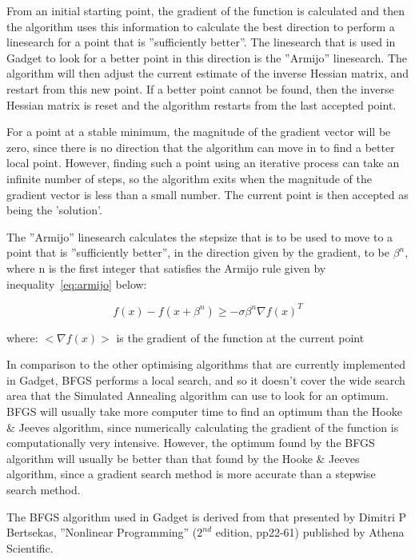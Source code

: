 \documentclass[10pt,twoside]{book}
\begin{document}
\bigskip
From an initial starting point, the gradient of the function is calculated and then the algorithm uses this information to calculate the best direction to perform a linesearch for a point that is ''sufficiently better''.  The linesearch that is used in Gadget to look for a better point in this direction is the ''Armijo'' linesearch.  The algorithm will then adjust the current estimate of the inverse Hessian matrix, and restart from this new point.  If a better point cannot be found, then the inverse Hessian matrix is reset and the algorithm restarts from the last accepted point.

\bigskip
For a point at a stable minimum, the magnitude of the gradient vector will be zero, since there is no direction that the algorithm can move in to find a better local point.  However, finding such a point using an iterative process can take an infinite number of steps, so the algorithm exits when the magnitude of the gradient vector is less than a small number.  The current point is then accepted as being the 'solution'.

\bigskip
The ''Armijo'' linesearch calculates the stepsize that is to be used to move to a point that is ''sufficiently better'', in the direction given by the gradient, to be $\beta^n$, where n is the first integer that satisfies the Armijo rule given by inequality~\ref{eq:armijo} below:

\begin{equation}\label{eq:armijo}
f(x) - f(x + \beta^{n}) \geq - \sigma \beta^{n} \nabla f(x) ^{T}
\end{equation}

where:\newline
$<\nabla f(x)>$ is the gradient of the function at the current point

\bigskip
In comparison to the other optimising algorithms that are currently implemented in Gadget, BFGS performs a local search, and so it doesn't cover the wide search area that the Simulated Annealing algorithm can use to look for an optimum.  BFGS will usually take more computer time to find an optimum than the Hooke \& Jeeves algorithm, since numerically calculating the gradient of the function is computationally very intensive.  However, the optimum found by the BFGS algorithm will usually be better than that found by the Hooke \& Jeeves algorithm, since a gradient search method is more accurate than a stepwise search method.

\bigskip
The BFGS algorithm used in Gadget is derived from that presented by Dimitri P Bertsekas, ''Nonlinear Programming'' ($2^{nd}$ edition, pp22-61) published by Athena Scientific.
\end{document}
